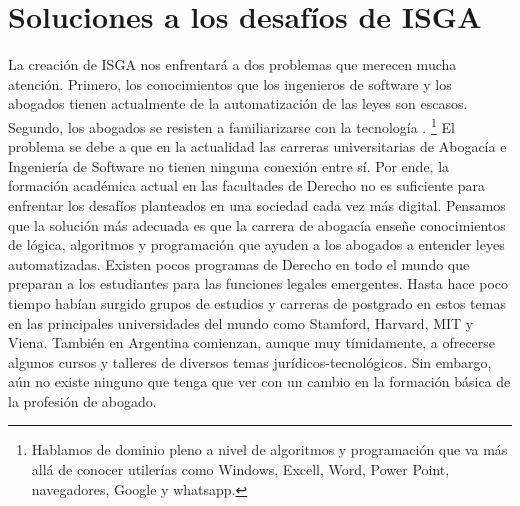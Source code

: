 \documentclass[12pt]{report} %
\begin{document}
\section{Soluciones a los desafíos de ISGA }

La creación de ISGA nos enfrentará a dos problemas que merecen mucha atención. Primero, los conocimientos que los ingenieros de software y los abogados tienen actualmente de la automatización de las leyes son escasos. Segundo, los abogados se resisten a familiarizarse con la tecnología  . \footnote{ Hablamos de dominio pleno a nivel de algoritmos y programación que va más allá de conocer utilerías como Windows, Excell, Word, Power Point, navegadores, Google y whatsapp.} El problema se debe a que en la actualidad las carreras universitarias de Abogacía e Ingeniería de Software no tienen ninguna conexión entre sí. Por ende, la formación académica actual en las facultades de Derecho no es suficiente para enfrentar los desafíos planteados en una sociedad cada vez más digital. Pensamos que la solución más adecuada es que la carrera de abogacía enseñe conocimientos de lógica, algoritmos y programación que ayuden a los abogados a entender leyes automatizadas. Existen pocos programas de Derecho en todo el mundo que preparan a los estudiantes para las funciones legales emergentes. Hasta hace poco tiempo habían surgido grupos de estudios y carreras de postgrado en estos temas en las principales universidades del mundo como Stamford, Harvard, MIT y Viena. También en Argentina comienzan, aunque muy tímidamente, a ofrecerse algunos cursos y talleres de diversos temas jurídicos-tecnológicos. Sin embargo, aún no existe ninguno que tenga que ver con un cambio en la formación básica de la profesión de abogado. 
\end{document}
